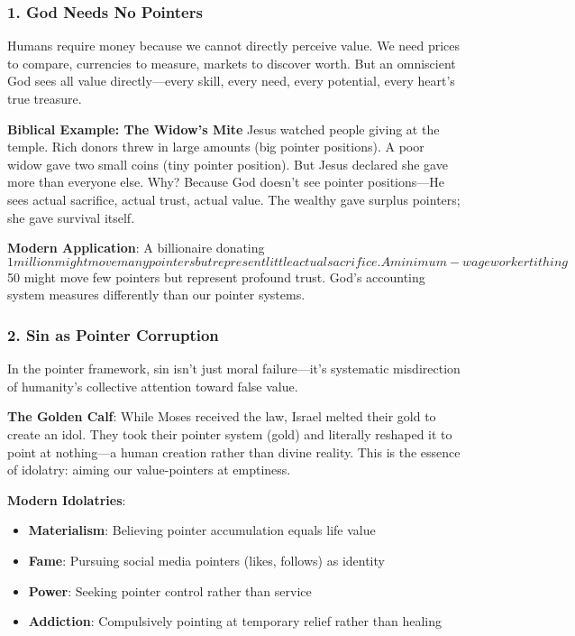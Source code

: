 \documentclass[11pt,oneside]{book}
\begin{document}
\subsubsection{1. God Needs No Pointers}

Humans require money because we cannot directly perceive value. We need prices to compare, currencies to measure, markets to discover worth. But an omniscient God sees all value directly—every skill, every need, every potential, every heart's true treasure.

\textbf{Biblical Example: The Widow's Mite}
Jesus watched people giving at the temple. Rich donors threw in large amounts (big pointer positions). A poor widow gave two small coins (tiny pointer position). But Jesus declared she gave more than everyone else. Why? Because God doesn't see pointer positions—He sees actual sacrifice, actual trust, actual value. The wealthy gave surplus pointers; she gave survival itself.

\textbf{Modern Application}: A billionaire donating $1 million might move many pointers but represent little actual sacrifice. A minimum-wage worker tithing $50 might move few pointers but represent profound trust. God's accounting system measures differently than our pointer systems.

\subsubsection{2. Sin as Pointer Corruption}

In the pointer framework, sin isn't just moral failure—it's systematic misdirection of humanity's collective attention toward false value.

\textbf{The Golden Calf}: While Moses received the law, Israel melted their gold to create an idol. They took their pointer system (gold) and literally reshaped it to point at nothing—a human creation rather than divine reality. This is the essence of idolatry: aiming our value-pointers at emptiness.

\textbf{Modern Idolatries}:
\begin{itemize}
\item \textbf{Materialism}: Believing pointer accumulation equals life value
\item \textbf{Fame}: Pursuing social media pointers (likes, follows) as identity
\item \textbf{Power}: Seeking pointer control rather than service
\item \textbf{Addiction}: Compulsively pointing at temporary relief rather than healing
\end{itemize}
\end{document}
